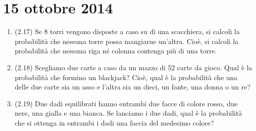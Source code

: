 \section{15 ottobre 2014}

\begin{enumerate}
    \item (2.17) Se 8 torri vengono disposte a caso su di una scacchiera, si calcoli la probabilit\`a che nessuna torre possa mangiarne un'altra. Cio\`e, si calcoli la probabilit\`a che nessuna riga n\'e colonna contenga pi\`u di una torre.
    \item (2.18) Scegliamo due carte a caso da un mazzo di 52 carte da gioco. Qual \`e la probabilit\`a che formino un blackjack? Cio\`e, qual \`e la probabilit\`a che una delle due carte sia un asso e l'altra sia un dieci, un fante, una donna o un re?
    \item (2.19) Due dadi equilibrati hanno entrambi due facce di colore rosso, due nere, una gialla e una bianca. Se lanciamo i due dadi, qual \`e la probabilit\`a che si ottenga in entrambi i dadi una faccia del medesimo colore?
\end{enumerate}
